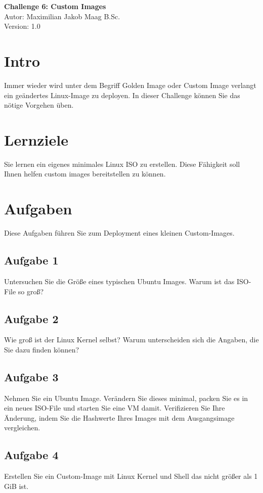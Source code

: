 \documentclass{article}
\begin{document}
    \begin{center}
        \Large \textbf{Challenge 6: Custom Images} \\ [6pt]
        \normalsize
        Autor: Maximilian Jakob Maag B.Sc. \\
        Version: 1.0
    \end{center}

    \section{Intro}
    Immer wieder wird unter dem Begriff Golden Image oder Custom Image verlangt ein geändertes Linux-Image zu deployen.
    In dieser Challenge können Sie das nötige Vorgehen üben.

    \section{Lernziele}
    Sie lernen ein eigenes minimales Linux ISO zu erstellen.
    Diese Fähigkeit soll Ihnen helfen custom images bereitstellen zu können.

    \section{Aufgaben}
    Diese Aufgaben führen Sie zum Deployment eines kleinen Custom-Images.

    \subsection{Aufgabe 1}
    Untersuchen Sie die Größe eines typischen Ubuntu Images. Warum ist das ISO-File so groß?

    \subsection{Aufgabe 2}
    Wie groß ist der Linux Kernel selbst? Warum unterscheiden sich die Angaben, die Sie dazu finden können?

    \subsection{Aufgabe 3}
    Nehmen Sie ein Ubuntu Image. Verändern Sie dieses minimal, packen Sie es in ein neues ISO-File und starten Sie eine VM damit.
    Verifizieren Sie Ihre Änderung, indem Sie die Hashwerte Ihres Images mit dem Ausgangsimage vergleichen.

    \subsection{Aufgabe 4}
    Erstellen Sie ein Custom-Image mit Linux Kernel und Shell das nicht größer als 1 GiB ist.
\end{document}
